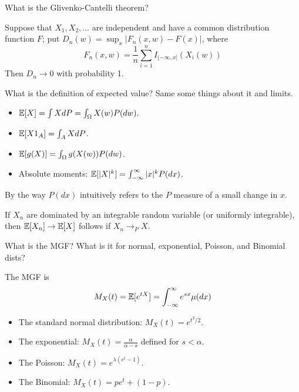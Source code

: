 \documentclass[avery5388,grid,frame]{flashcards}
\begin{document}
\begin{flashcard}
    {What is the Glivenko-Cantelli theorem?}
    \begin{theorem}
        Suppose that $X_1, X_2, \dots$ are independent and have a common distribution function $F$; put $D_n(w) = \sup_x |F_n(x, w) - F(x)|$, where
        $$F_n(x,w) = \frac 1 n \sum_{i=1}^n I_{(-\infty,x]}(X_i(w))$$
        Then $D_n \rightarrow 0$ with probability 1.
    \end{theorem}
\end{flashcard}


\begin{flashcard}
    {What is the definition of expected value? Same some things about it and limits.}
    \begin{definition}
        \begin{itemize}
            \item $\mathbb{E}[X] = \int X dP = \int_\Omega X(w) P(dw).$
            \item $\mathbb{E}[X 1_A] = \int_A X dP$.
            \item $\mathbb{E}[g(X)] = \int_\Omega g(X(w)) P(dw)$.
            \item Absolute moments: $\mathbb{E}[|X|^k] = \int_{-\infty}^\infty |x|^k P(dx)$.
        \end{itemize}
    \end{definition}

    \begin{remark}
        By the way $P(dx)$ intuitively refers to the $P$ measure of a small change in $x$.
    \end{remark}
    \begin{remark}
        If $X_n$ are dominated by an integrable random variable (or uniformly integrable), then $\mathbb{E}[X_n] \rightarrow \mathbb{E}[X]$ follows if $X_n \rightarrow_P X$.
    \end{remark}
\end{flashcard}


\begin{flashcard}
    {What is the MGF? What is it for normal, exponential, Poisson, and Binomial dists?}
    \begin{definition}
        The MGF is
        $$M_X(t) = \mathbb{E}[e^{tX}] = \int_{-\infty}^\infty e^{sx} \mu(dx)$$
    \end{definition}

    \begin{properties}
        \begin{itemize}
            \item The standard normal distribution: $M_X(t) = e^{t^2/2}$.
            \item The exponential: $M_X(t) = \frac{\alpha}{\alpha - s}$ defined for $s < \alpha$.
            \item The Poisson: $M_X(t) = e^{\lambda (e^t - 1)}$.
            \item The Binomial: $M_X(t) = p e^t + (1-p)$.
        \end{itemize}
    \end{properties}
\end{flashcard}
\end{document}
